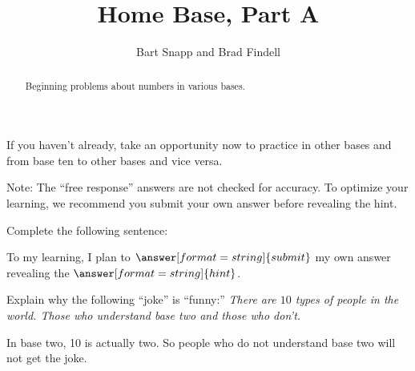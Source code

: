 \documentclass[nooutcomes]{ximera}
\title{Home Base, Part A}
\author{Bart Snapp and Brad Findell}
\begin{document}
\begin{abstract}
Beginning problems about numbers in various bases. 
\end{abstract}
\maketitle

%
%

If you haven't already, take an opportunity now to practice  in other bases and  from base ten to other bases and vice versa.    

%
%


\begin{problem}
Note:  The ``free response'' answers are not checked for accuracy.  To optimize your learning, we recommend you submit your own answer before revealing the hint.  

Complete the following sentence: 

To  my learning, I plan to $\answer[format=string]{submit}$ my own answer  revealing the $\answer[format=string]{hint}$.  
\end{problem}

\begin{problem}Explain why the following ``joke'' is ``funny:'' \textit{There
  are $10$ types of people in the world. Those who understand base two
  and those who don't.}
\begin{freeResponse}
\begin{hint}
In base two, 10 is actually two.  So people who do not understand base two will not get the joke.  
\end{hint}
\end{freeResponse}
\end{problem} 
\end{document}
